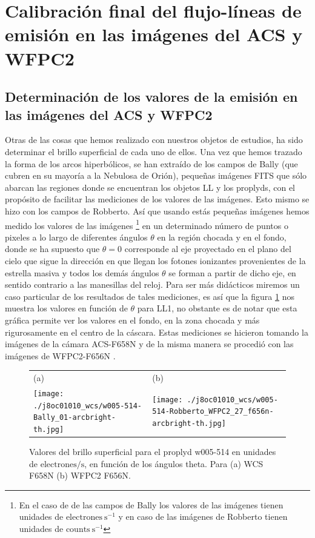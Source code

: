 \documentclass{article}
\begin{document}
\section{Calibración final del flujo-líneas de emisión en las imágenes del ACS y WFPC2}
\label{sec:clibration-final}

\subsection{Determinación de los valores  de la emisión en las imágenes del ACS y WFPC2 }
\label{sec:brillo-superficial}
Otras de las cosas que hemos realizado con nuestros objetos de estudios, ha  sido determinar el brillo superficial de cada uno de ellos. Una vez que hemos trazado la forma de los arcos hiperbólicos, se han extraído de los campos de Bally (que cubren en su mayoría a la Nebulosa de Orión), pequeñas imágenes FITS que sólo abarcan las regiones donde se encuentran los objetos LL y los proplyds, con el propósito de facilitar las mediciones de los valores de las imágenes. Esto mismo se hizo con los campos de Robberto. Así que usando estás pequeñas imágenes hemos medido los valores de las imágenes \footnote{En el caso de de las campos de Bally los valores de las imágenes tienen unidades de \(\mathrm{electrones~s^{-1}}\) y en caso de las imágenes de Robberto tienen unidades de \(\text{counts}~\text{s}^{-1}\)} en un determinado número de puntos o pixeles a lo largo de diferentes ángulos \(\theta\) en la región chocada y en el fondo, donde se ha supuesto que \(\theta = 0\) corresponde al eje proyectado en el plano del cielo que sigue la dirección en que llegan los fotones ionizantes provenientes de la estrella masiva y todos los demás ángulos \(\theta\) se forman a partir de dicho eje, en sentido contrario a las manesillas del reloj. Para ser más didácticos miremos un caso particular de los resultados de tales mediciones, es así que la figura \ref{fig:brillo-theta} nos muestra los valores en función de \(\theta\) para LL1, no obstante es de notar que esta gráfica permite ver los valores en el fondo, en la zona chocada y más rigurosamente en el centro de la cáscara. Estas mediciones se hicieron tomando la imágenes de la cámara ACS-F658N y de la misma manera se procedió con las imágenes de WFPC2-F656N \citep{Robberto:2013a}. \\

\begin{figure}[htp]
\centering
\begin{tabular}{l l}
(a) & (b)  \\
  \texttt{[image: ./j8oc01010\_wcs/w005-514-Bally\_01-arcbright-th.jpg]}
& \texttt{[image: ./j8oc01010\_wcs/w005-514-Robberto\_WFPC2\_27\_f656n-arcbright-th.jpg]}\\
\end{tabular}
\caption{Valores del brillo superficial para el proplyd w005-514 en unidades de \(\text{electrones}/\text{s}\), en función de los ángulos theta. Para (a) WCS F658N (b) WFPC2 F656N.}\label{fig:brillo-theta}
\end{figure}
\end{document}
